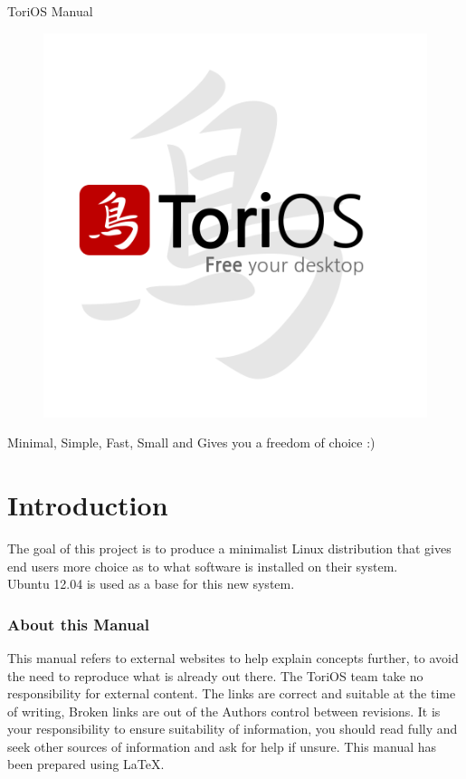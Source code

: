 \documentclass[12pt,a4paper]{book}
\author{Paul Sutton}
\begin{document}
\begin{center}
{\Huge ToriOS Manual}
\end{center}



\begin{figure}
\centering
\includegraphics[width=0.7\linewidth]{./FinalLogo}
\caption{}
\label{fig:FinalLogo}
\end{figure}


\begin{center}
Minimal, Simple, Fast, Small and Gives you a freedom of choice :)
\end{center}
\tableofcontents
\chapter{Introduction}
The goal of this project is to produce a minimalist Linux distribution that gives end users more choice as to what software is installed on their system.\\

Ubuntu 12.04 is used as a base for this new system.
\subsection{About this Manual}
This manual refers to external websites to help explain concepts further, to avoid the need to reproduce what is already out there.  The ToriOS team take no responsibility for external content.  The links are correct and suitable at the time of writing,  Broken links are out of the Authors control between revisions.  It is your responsibility to ensure suitability of information, you should read fully and seek other sources of information and ask for help if unsure.  
This manual has been prepared using \LaTeX. 
\end{document}
